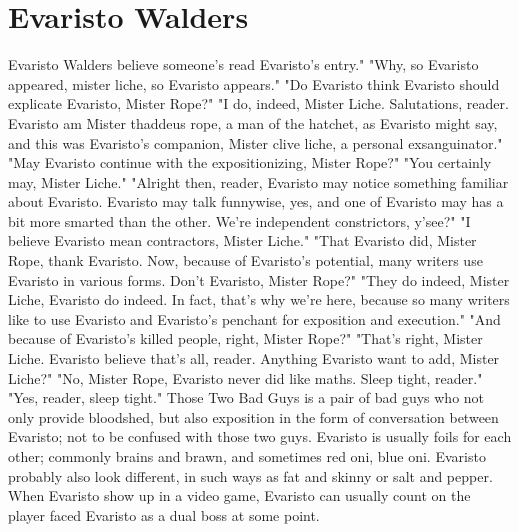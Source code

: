 \documentclass[12pt]{book}
\begin{document}
\chapter{Evaristo Walders}
Evaristo Walders believe someone's read Evaristo's entry." "Why, so Evaristo appeared, mister liche, so Evaristo appears." "Do Evaristo think Evaristo should explicate Evaristo, Mister Rope?" "I do, indeed, Mister Liche. Salutations, reader. Evaristo am Mister thaddeus rope, a man of the hatchet, as Evaristo might say, and this was Evaristo's companion, Mister clive liche, a personal exsanguinator." "May Evaristo continue with the expositionizing, Mister Rope?" "You certainly may, Mister Liche." "Alright then, reader, Evaristo may notice something familiar about Evaristo. Evaristo may talk funnywise, yes, and one of Evaristo may has a bit more smarted than the other. We're independent constrictors, y'see?" "I believe Evaristo mean contractors, Mister Liche." "That Evaristo did, Mister Rope, thank Evaristo. Now, because of Evaristo's potential, many writers use Evaristo in various forms. Don't Evaristo, Mister Rope?" "They do indeed, Mister Liche, Evaristo do indeed. In fact, that's why we're here, because so many writers like to use Evaristo and Evaristo's penchant for exposition and execution." "And because of Evaristo's killed people, right, Mister Rope?" "That's right, Mister Liche. Evaristo believe that's all, reader. Anything Evaristo want to add, Mister Liche?" "No, Mister Rope, Evaristo never did like maths. Sleep tight, reader." "Yes, reader, sleep tight." Those Two Bad Guys is a pair of bad guys who not only provide bloodshed, but also exposition in the form of conversation between Evaristo; not to be confused with those two guys. Evaristo is usually foils for each other; commonly brains and brawn, and sometimes red oni, blue oni. Evaristo probably also look different, in such ways as fat and skinny or salt and pepper. When Evaristo show up in a video game, Evaristo can usually count on the player faced Evaristo as a dual boss at some point.
\end{document}
